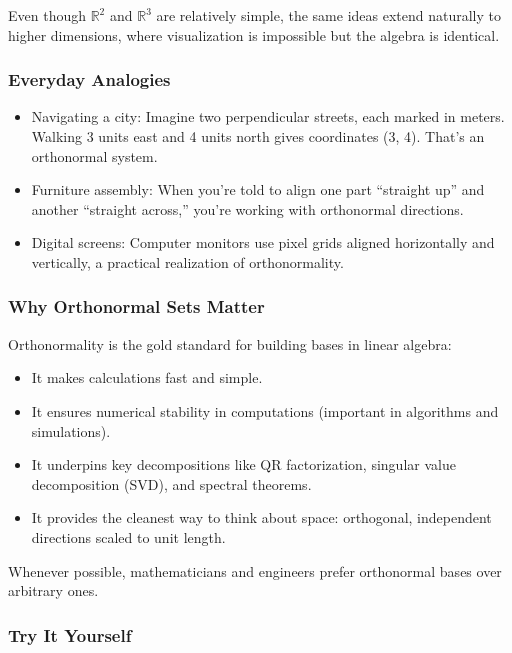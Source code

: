 \documentclass[
  letterpaper,
  DIV=11,
  numbers=noendperiod]{scrreprt}
\providecommand{\tightlist}{%
  \setlength{\itemsep}{0pt}\setlength{\parskip}{0pt}}
\begin{document}
Even though \(\mathbb{R}^2\) and \(\mathbb{R}^3\) are relatively simple,
the same ideas extend naturally to higher dimensions, where
visualization is impossible but the algebra is identical.

\subsubsection{Everyday Analogies}\label{everyday-analogies-7}

\begin{itemize}
\tightlist
\item
  Navigating a city: Imagine two perpendicular streets, each marked in
  meters. Walking 3 units east and 4 units north gives coordinates (3,
  4). That's an orthonormal system.
\item
  Furniture assembly: When you're told to align one part ``straight up''
  and another ``straight across,'' you're working with orthonormal
  directions.
\item
  Digital screens: Computer monitors use pixel grids aligned
  horizontally and vertically, a practical realization of
  orthonormality.
\end{itemize}

\subsubsection{Why Orthonormal Sets
Matter}\label{why-orthonormal-sets-matter}

Orthonormality is the gold standard for building bases in linear
algebra:

\begin{itemize}
\tightlist
\item
  It makes calculations fast and simple.
\item
  It ensures numerical stability in computations (important in
  algorithms and simulations).
\item
  It underpins key decompositions like QR factorization, singular value
  decomposition (SVD), and spectral theorems.
\item
  It provides the cleanest way to think about space: orthogonal,
  independent directions scaled to unit length.
\end{itemize}

Whenever possible, mathematicians and engineers prefer orthonormal bases
over arbitrary ones.

\subsubsection{Try It Yourself}\label{try-it-yourself-9}
\end{document}
